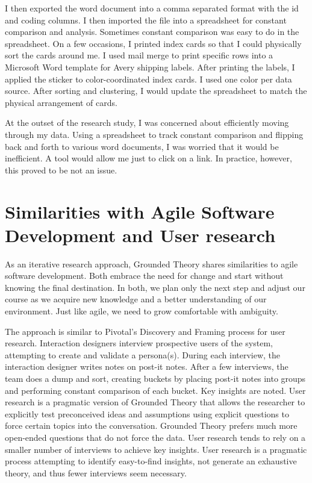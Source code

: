 I then exported the word document into a comma separated format with the id and coding columns. I then imported the file into a spreadsheet for constant comparison and analysis. Sometimes constant comparison was easy to do in the spreadsheet. On a few occasions, I printed index cards so that I could physically sort the cards around me. I used mail merge to print specific rows into a Microsoft Word template for Avery shipping labels. After printing the labels, I applied the sticker to color-coordinated index cards. I used one color per data source. After sorting and clustering, I would update the spreadsheet to match the physical arrangement of cards.

At the outset of the research study, I was concerned about efficiently moving through my data. Using a spreadsheet to track constant comparison and flipping back and forth to various word documents, I was worried that it would be inefficient. A tool would allow me just to click on a link. In practice, however, this proved to be not an issue.

\section{Similarities with Agile Software Development and User research}
As an iterative research approach, Grounded Theory shares similarities to agile software development. Both embrace the need for change and start without knowing the final destination. In both, we plan only the next step and adjust our course as we acquire new knowledge and a better understanding of our environment. Just like agile, we need to grow comfortable with ambiguity. 

The approach is similar to Pivotal's Discovery and Framing process for user research. Interaction designers interview prospective users of the system, attempting to create and validate a persona(s). During each interview, the interaction designer writes notes on post-it notes. After a few interviews, the team does a dump and sort, creating buckets by placing post-it notes into groups and performing constant comparison of each bucket. Key insights are noted. User research is a pragmatic version of Grounded Theory that allows the researcher to explicitly test preconceived ideas and assumptions using explicit questions to force certain topics into the conversation.  Grounded Theory prefers much more open-ended questions that do not force the data. User research tends to rely on a smaller number of interviews to achieve key insights. 
User research is a pragmatic process attempting to identify easy-to-find insights, not generate an exhaustive theory, and thus fewer interviews seem necessary.



